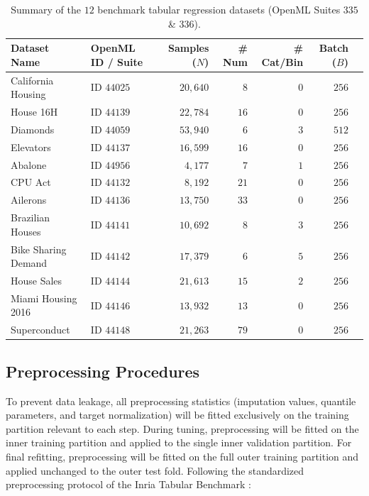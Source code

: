 \documentclass[11pt, a4paper]{article}
\begin{document}
\begin{table}[htbp]
    \centering
    \caption{Summary of the $12$ benchmark tabular regression datasets (OpenML Suites $335$ \& $336$).}
    \label{tab:reg_datasets}
    \vspace{0.2cm}
    \small
    \begin{tabular}{llrrrrc}
        \toprule
        \textbf{Dataset Name} & \textbf{OpenML ID / Suite} & \textbf{Samples ($N$)} & \textbf{\# Num} & \textbf{\# Cat/Bin} & \textbf{Batch ($B$)} \\
        \midrule
        California Housing & ID $44025$ \cite{grinsztajn2022why} & $20{,}640$ & $8$ & $0$ & $256$ \\
        House 16H & ID $44139$ \cite{grinsztajn2022why} & $22{,}784$ & $16$ & $0$ & $256$ \\
        Diamonds & ID $44059$ \cite{grinsztajn2022why} & $53{,}940$ & $6$ & $3$ & $512$ \\
        Elevators & ID $44137$ \cite{grinsztajn2022why} & $16{,}599$ & $16$ & $0$ & $256$ \\
        Abalone & ID $44956$ \cite{grinsztajn2022why} & $4{,}177$ & $7$ & $1$ & $256$ \\
        CPU Act & ID $44132$ \cite{grinsztajn2022why} & $8{,}192$ & $21$ & $0$ & $256$ \\
        Ailerons & ID $44136$ \cite{grinsztajn2022why} & $13{,}750$ & $33$ & $0$ & $256$ \\
        Brazilian Houses & ID $44141$ \cite{grinsztajn2022why} & $10{,}692$ & $8$ & $3$ & $256$ \\
        Bike Sharing Demand & ID $44142$ \cite{grinsztajn2022why} & $17{,}379$ & $6$ & $5$ & $256$ \\
        House Sales & ID $44144$ \cite{grinsztajn2022why} & $21{,}613$ & $15$ & $2$ & $256$ \\
        Miami Housing 2016 & ID $44146$ \cite{grinsztajn2022why} & $13{,}932$ & $13$ & $0$ & $256$ \\
        Superconduct & ID $44148$ \cite{grinsztajn2022why} & $21{,}263$ & $79$ & $0$ & $256$ \\
        \bottomrule
    \end{tabular}
\end{table}

\subsection{Preprocessing Procedures}
To prevent data leakage, all preprocessing statistics (imputation values, quantile parameters, and target normalization) will be fitted exclusively on the training partition relevant to each step. During tuning, preprocessing will be fitted on the inner training partition and applied to the single inner validation partition. For final refitting, preprocessing will be fitted on the full outer training partition and applied unchanged to the outer test fold. Following the standardized preprocessing protocol of the Inria Tabular Benchmark \cite{grinsztajn2022why}:
\end{document}
